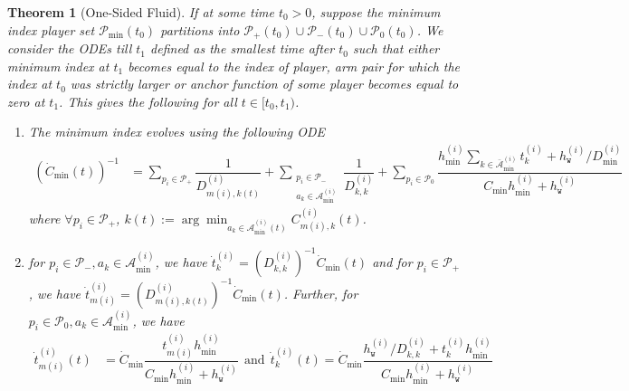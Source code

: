 \documentclass{article}
\newtheorem{theorem}{Theorem}
\begin{document}
\begin{theorem}[One-Sided Fluid]
\label{thm:onesidedgeneral}
    If at some time $t_0>0$, suppose the minimum index player set $\mathcal{P}_{\min}(t_0)$ partitions into $\mathcal{P}_{+}(t_0)\cup\mathcal{P}_{-}(t_0)\cup \mathcal{P}_{0}(t_0)$. We consider the ODEs till $t_1$ defined as the smallest time after $t_0$ such that either minimum index at $t_1$ becomes equal to the index of player, arm pair for which the index at $t_0$ was strictly larger
     or anchor function of some player becomes equal to zero at $t_1$. This gives  the following for all $t\in [t_0,t_1)$.

        

\begin{enumerate}[leftmargin=*, nosep,noitemsep, topsep=0pt]
\item The minimum index evolves using the following ODE \vspace{-0.1in}\begin{align*}
    \left(\dot{C}_{\min}(t)\right)^{-1}&=\sum_{p_i\in\mathcal{P}_{+}}\dfrac{1}{D^{(i)}_{m(i),k(t)}}+\sum_{\scriptstyle \substack{p_i \in \mathcal{P}_{-} \\ a_k \in \mathcal{A}^{(i)}_{\min}}}
\dfrac{1}{D^{(i)}_{k,k}}+\sum_{p_i\in\mathcal{P}_{0}}\dfrac{h^{(i)}_{\min}\sum_{k\in\bar{\mathcal{A}}^{(i)}_{\min}}t^{(i)}_k+h^{(i)}_{\texttt{w}}/D^{(i)}_{\min}}{C_{\min}h^{(i)}_{\min}+h^{(i)}_{\texttt{w}}}
\end{align*}
where $\forall p_i\in \mathcal{P}_{+}$, $k(t) := \arg\min_{a_k\in\mathcal{A}^{(i)}_{\min}(t)}C^{(i)}_{m(i),k}(t)$.
    \item for $p_i\in \mathcal{P}_{-}, a_k\in\mathcal{A}^{(i)}_{\min}$, we have $\dot{t}^{(i)}_k = (D^{(i)}_{k,k})^{-1}\dot{C}_{\min}(t)$ and for $p_i\in \mathcal{P}_{+}$, we have $\dot{t}^{(i)}_{m(i)} = (D^{(i)}_{m(i),k(t)})^{-1}\dot{C}_{\min}(t)$. Further, for  $p_i\in \mathcal{P}_{0}, a_k\in\mathcal{A}^{(i)}_{\min}$, we have
    \begin{align*}
     \dot{t}^{(i)}_{m(i)}(t) &= \dot{C}_{\min}\dfrac{t^{(i)}_{m(i)}h^{(i)}_{\min}}{C_{\min }h^{(i)}_{\min}+h^{(i)}_{\texttt{w}}}\ \ \text{and}\ \ 
      \dot{t}^{(i)}_{k}(t) = \dot{C}_{\min}\dfrac{h^{(i)}_{\texttt{w}}/D^{(i)}_{k,k}+t^{(i)}_k h^{(i)}_{\min}}{{C_{\min} h^{(i)}_{\min}}+h^{(i)}_{\texttt{w}}}
\end{align*}
 

\end{enumerate}
\end{theorem}
\end{document}
